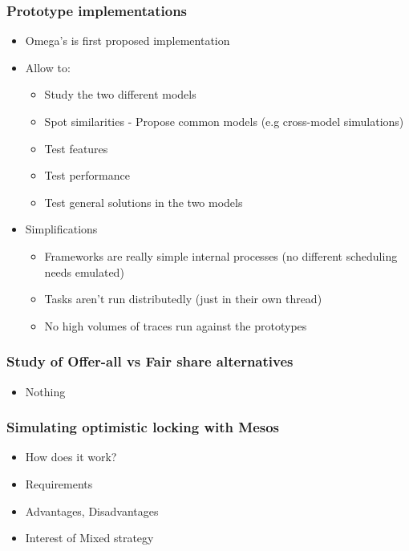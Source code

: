 \documentclass[notes]{beamer}
\begin{document}
  \begin{frame}
    \frametitle{Prototype implementations}
    \begin{itemize}
        \item Omega's is first proposed implementation
        \item Allow to:
        \begin{itemize}
          \item Study the two different models
          \item Spot similarities - Propose common models (e.g
            cross-model simulations)
          \item Test features
          \item Test performance
          \item Test general solutions in the two models 
        \end{itemize}
        \item Simplifications
          \begin{itemize}
            \item Frameworks are really simple internal processes (no
              different scheduling needs emulated)
            \item Tasks aren't run distributedly (just in their own thread)
            \item No high volumes of traces run against the prototypes
          \end{itemize}
    \end{itemize}
  \end{frame}

  \note{}

  \begin{frame}
    \frametitle{Study of Offer-all vs Fair share alternatives}
    \begin{itemize}
      \item Nothing
    \end{itemize}
  \end{frame}

  \note{}

  \begin{frame}
    \frametitle{Simulating optimistic locking with Mesos}
    \begin{itemize}
      \item How does it work?
      \item Requirements
      \item Advantages, Disadvantages
      \item Interest of Mixed strategy
    \end{itemize}
  \end{frame}
\end{document}
